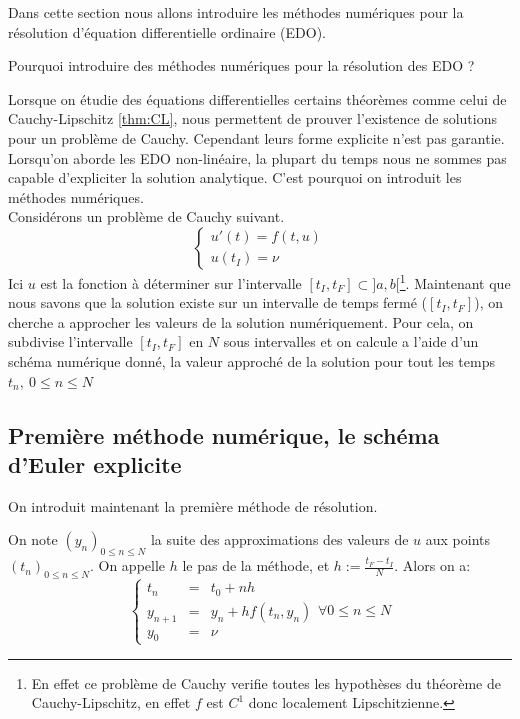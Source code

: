 \documentclass{article}
\newtheorem[M , nocut]{prop}{Proposition}[section]
\newtheorem[M , nocut]{definition}{Définition}
\newtheorem[M , nocut]{lemme}{Lemme}
\newtheorem[L , nocut]{thm}{Théoreme}
\newtheorem[M , nocut]{cor}{Corollaire}
\begin{document}
Dans cette section nous allons introduire les méthodes numériques pour la résolution d'équation differentielle ordinaire (EDO). 
\begin{example}[Problématique]
    Pourquoi introduire des méthodes numériques pour la résolution des EDO ? 
\end{example}
Lorsque on étudie des équations differentielles certains théorèmes comme celui de Cauchy-Lipschitz \ref{thm:CL}, nous permettent de prouver l'existence de solutions pour un problème de Cauchy. Cependant leurs forme explicite n'est pas garantie. Lorsqu'on aborde les EDO non-linéaire, la plupart du temps nous ne sommes pas capable d'expliciter la solution analytique. C'est pourquoi on introduit les méthodes numériques.\\
Considérons un problème de Cauchy suivant.
\[
    \left\{\begin{array}{l}
        u'(t)=f(t,u)\\
        u(t_I) = \nu
    \end{array}\right.
\]
Ici $u$ est la fonction à déterminer sur l'intervalle $[t_I,t_F] \subset ]a,b[$\footnote{En effet ce problème de Cauchy verifie toutes les hypothèses du théorème de Cauchy-Lipschitz, en effet $f$ est $C^1$ donc localement Lipschitzienne.}.
Maintenant que nous savons que la solution existe sur un intervalle de temps fermé ($[t_I,t_F]$), on cherche a approcher les valeurs de la solution numériquement. Pour cela, on subdivise l'intervalle $[t_I,t_F]$ en $N$ sous intervalles et on calcule a l'aide d'un schéma numérique donné, la valeur approché de la solution pour tout les temps $t_n,\ 0\le n \le N$

\subsection*{Première méthode numérique, le schéma d'Euler explicite}

On introduit maintenant la première méthode de résolution.
\begin{definition}
    On note $(y_n)_{0 \le n \le N}$ la suite des approximations des valeurs de $u$ aux points $(t_n)_{0 \le n \le N}$. On appelle $h$ le pas de la méthode, et $h:= \frac{t_F-t_I}{N}$. Alors on a:
    \[
        \left\{\begin{array}{rcl}
        t_n &=& t_0 + n h \\
        y_{n+1} &=& y_n + h f(t_n,y_n)\\
        y_0 &=& \nu
        \end{array}\right. \forall 0 \le n \le N
    \]
\end{definition}
\end{document}
